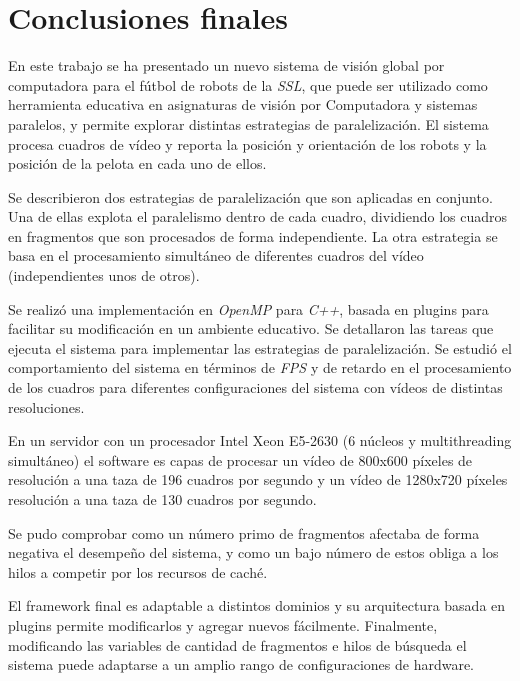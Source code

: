 
\section{Conclusiones finales}

\label{concluciones}

En este trabajo se ha presentado un nuevo sistema de visión global por
computadora para el fútbol de robots de la \emph{SSL}, que puede ser utilizado
como herramienta educativa en asignaturas de visión por Computadora y sistemas
paralelos, y permite explorar distintas estrategias de paralelización. El
sistema procesa cuadros de vídeo y reporta la posición y orientación de los
robots y la posición de la pelota en cada uno de ellos.

Se describieron dos estrategias de paralelización que son aplicadas en conjunto.
Una de ellas explota el paralelismo dentro de cada cuadro, dividiendo los
cuadros en fragmentos que son procesados de forma independiente. La otra
estrategia se basa en el procesamiento simultáneo de diferentes cuadros del
vídeo (independientes unos de otros).

Se realizó una implementación en \emph{OpenMP} para \emph{C++}, basada en
plugins para facilitar su modificación en un ambiente educativo. Se detallaron
las tareas que ejecuta el sistema para implementar las estrategias de
paralelización. Se estudió el comportamiento del sistema en términos de
\emph{FPS} y de retardo en el procesamiento de los cuadros para diferentes
configuraciones del sistema con vídeos de distintas resoluciones.

En un servidor con un procesador Intel Xeon E5-2630 (6 núcleos y multithreading
simultáneo) el software es capas de procesar un vídeo de 800x600 píxeles de
resolución a una taza de 196 cuadros por segundo y un vídeo de 1280x720 píxeles
resolución a una taza de 130 cuadros por segundo.

Se pudo comprobar como un número primo de fragmentos afectaba de forma negativa
el desempeño del sistema, y como un bajo número de estos obliga a los hilos a
competir por los recursos de caché.

El framework final es adaptable a distintos dominios y su arquitectura basada en
plugins permite modificarlos y agregar nuevos fácilmente. Finalmente,
modificando las variables de cantidad de fragmentos e hilos de búsqueda el
sistema puede adaptarse a un amplio rango de configuraciones de hardware.

